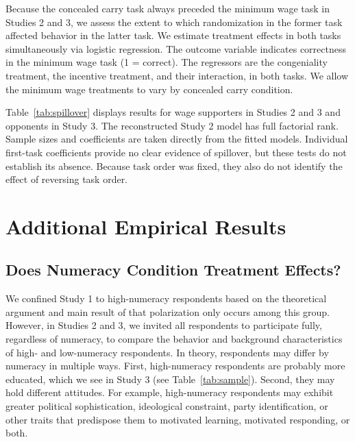 Because the concealed carry task always preceded the minimum wage task in Studies 2 and 3, we assess the extent to which randomization in the former task affected behavior in the latter task. We estimate treatment effects in both tasks simultaneously via logistic regression. The outcome variable indicates correctness in the minimum wage task (1 = correct). The regressors are the congeniality treatment, the incentive treatment, and their interaction, in both tasks. We allow the minimum wage treatments to vary by concealed carry condition.

Table~\ref{tab:spillover} displays results for wage supporters in Studies 2 and 3 and opponents in Study 3. The reconstructed Study 2 model has full factorial rank. Sample sizes and coefficients are taken directly from the fitted models. Individual first-task coefficients provide no clear evidence of spillover, but these tests do not establish its absence. Because task order was fixed, they also do not identify the effect of reversing task order.

\medskip
\begingroup\footnotesize\singlespacing

\endgroup
\normalsize
\doublespacing

\clearpage
\doublespacing
\section{Additional Empirical Results}

\subsection{Does Numeracy Condition Treatment Effects?}
\label{sec:numeracy}
\doublespacing

We confined Study 1 to high-numeracy respondents based on the theoretical argument and main result of \citet{kahan2017} that polarization only occurs among this group. However, in Studies 2 and 3, we invited all respondents to participate fully, regardless of numeracy, to compare the behavior and background characteristics of high- and low-numeracy respondents. In theory, respondents may differ by numeracy in multiple ways. First, high-numeracy respondents are probably more educated, which we see in Study 3 (see Table~\ref{tab:sample}). Second, they may hold different attitudes. For example, high-numeracy respondents may exhibit greater political sophistication, ideological constraint, party identification, or other traits that predispose them to motivated learning, motivated responding, or both.

